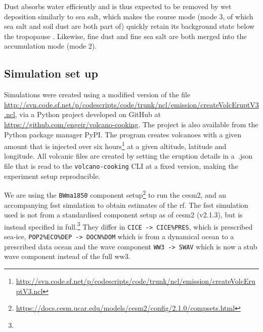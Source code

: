 \documentclass{ametsocV5}
\begin{document}
Dust absorbs water efficiently and is thus expected to be removed by wet deposition
similarly to sea salt, which makes the course mode (mode 3, of which sea salt and soil
dust are both part of) quickly retain its background state below the tropopause
\citep{liu2012}. Likewise, fine dust and fine sea salt are both merged into the
accumulation mode (mode 2).


\subsection{Simulation set up}

Simulations were created using a modified version of the file
\url{http://svn.code.sf.net/p/codescripts/code/trunk/ncl/emission/createVolcEruptV3.ncl},
via a Python project developed on GitHub at
\url{https://github.com/engeir/volcano-cooking}. The project is also available from the
Python package manager PyPI\@. The program creates volcanoes with a given 
amount that is injected over six
hours\footnote{\url{http://svn.code.sf.net/p/codescripts/code/trunk/ncl/emission/createVolcEruptV3.ncl}}
at a given altitude, latitude and longitude. All volcanic  files are created by
setting the eruption details in a~.json file that is read to the
\texttt{volcano-cooking} CLI at a fixed version, making the experiment setup
reproducible.

We are using the \texttt{BWma1850} component
setup\footnote{\url{https://docs.cesm.ucar.edu/models/cesm2/config/2.1.0/compsets.html}}
to run the \ac{cesm2}, and an accompanying \ac{fsst}
simulation to obtain estimates of the \ac{rf}. The \ac{fsst} simulation used is not from
a standardised component setup as of \ac{cesm2} (v2.1.3), but is instead specified in
full.\footnote{\fssturl}
%
They differ in \texttt{CICE -> CICE\%PRES}, which is prescribed sea-ice,
\texttt{POP2\%ECO\%DEP -> DOCN\%DOM} which is from a dynamical ocean to a prescribed
data ocean and the wave component \texttt{WW3 -> SWAV} which is now a stub wave
component instead of the full \ac{ww3}.
\end{document}
